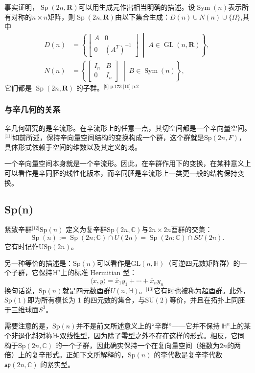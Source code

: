 事实证明，$\operatorname{Sp}(2n, \mathbf{R})$可以用生成元作出相当明确的描述。设$\operatorname{Sym}(n)$表示所有对称的$n \times n$矩阵，则$\operatorname{Sp}(2n, \mathbf{R})$由以下集合生成：$D(n) \cup N(n) \cup \{\Omega\}$,其中
$$
\begin{aligned}
D(n) &= \left\{ 
\begin{bmatrix}
A & 0 \\
0 & (A^{T})^{-1}
\end{bmatrix}
\;\middle|\; A \in \operatorname{GL}(n, \mathbf{R})
\right\},\\
N(n) &= \left\{
\begin{bmatrix}
I_{n} & B \\
0 & I_{n}
\end{bmatrix}
\;\middle|\; B \in \operatorname{Sym}(n)
\right\},
\end{aligned}~
$$
它们都是 $\operatorname{Sp}(2n, \mathbf{R})$ 的子群。\(^\text{[9] p.173 [10] p.2}\)
\subsubsection{与辛几何的关系}
辛几何研究的是辛流形。在辛流形上的任意一点，其切空间都是一个辛向量空间。\(^\text{[11]}\)如前所述，保持辛向量空间结构的变换构成一个群，这个群就是$\mathrm{Sp}(2n, F)$，具体形式依赖于空间的维数以及其定义的域。

一个辛向量空间本身就是一个辛流形。因此，在辛群作用下的变换，在某种意义上可以看作是辛同胚的线性化版本，而辛同胚是辛流形上一类更一般的结构保持变换。
\subsection{Sp(n)}
紧致辛群\(^\text{[12]}\)$\mathrm{Sp}(n)$ 定义为复辛群$\mathrm{Sp}(2n, \mathbb{C})$与$2n \times 2n$酉群的交集：
$$
\operatorname{Sp}(n) := \operatorname{Sp}(2n;\mathbb{C}) \cap U(2n) 
= \operatorname{Sp}(2n;\mathbb{C}) \cap SU(2n).~
$$
它有时记作$\mathrm{USp}(2n)$。

另一种等价的描述是：$\mathrm{Sp}(n)$可以看作是$\mathrm{GL}(n, \mathbb{H})$（可逆四元数矩阵群）的一个子群，它保持$\mathbb{H}^n$上的标准 Hermitian 型：
$$
\langle x, y \rangle = \bar{x}_1 y_1 + \cdots + \bar{x}_n y_n~
$$
换句话说，$\mathrm{Sp}(n)$就是四元数酉群$U(n, \mathbb{H})$。\(^\text{[13]}\)它有时也被称为超酉群。此外，$\mathrm{Sp}(1)$即为所有模长为 1 的四元数的集合，与$\mathrm{SU}(2)$等价，并且在拓扑上同胚于三维球面$S^3$。

需要注意的是，$\mathrm{Sp}(n)$并不是前文所述意义上的“辛群”——它并不保持 $\mathbb{H}^n$上的某个非退化斜对称$\mathbb{H}$-双线性型，因为除了零型之外不存在这样的形式。相反，它同构于$\mathrm{Sp}(2n, \mathbb{C})$ 的一个子群，因此确实保持一个在复向量空间（维数为$2n$的两倍）上的复辛形式。正如下文所解释的，$\mathrm{Sp}(n)$ 的李代数是复辛李代数 $\mathfrak{sp}(2n, \mathbb{C})$ 的紧实型。

